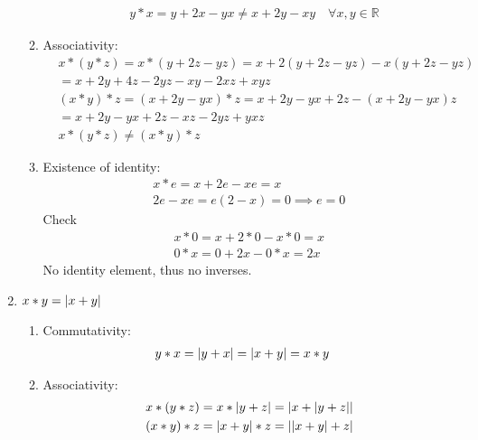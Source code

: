 \documentclass[nohyper,nobib]{tufte-handout}
\theoremstyle{definition}
\theoremstyle{remark}
\begin{document}
\begin{enumerate}
\begin{enumerate}[I]
                \begin{align}
                    & y * x = y + 2x - yx \neq x + 2y -xy \quad\forall x,y \in \mathbb{R}
                \end{align}
            \item Associativity:
                \begin{align}
                    &x * (y * z) = x * (y + 2z - yz) = x + 2(y + 2z - yz) - x(y + 2z - yz) \nonumber \\
                    &= x + 2y + 4z -2yz - xy - 2xz + xyz \nonumber \\
                    &(x * y) * z = (x + 2y - yx) * z = x + 2y - yx + 2z - (x + 2y -yx)z \nonumber \\
                                &= x + 2y - yx + 2z - xz - 2yz + yxz \nonumber \\
                                &x * (y * z) \neq (x * y) * z
                \end{align}
            \item Existence of identity:
                \begin{align}
                    x * e =  x + 2e - xe = x \nonumber \\
                    2e - xe = e(2 - x) = 0 \implies e = 0
                \end{align}
                Check
                \begin{align}
                    x * 0 = x + 2*0 - x*0 =  x \\
                    0 * x = 0 + 2x - 0*x  = 2x
                \end{align}
                No identity element, thus no inverses.
        \end{enumerate}
    \item $x * y = \abs{x + y}$
        \begin{enumerate}[I]
            \item Commutativity:
                \begin{align}
                    &y * x = \abs{y + x} = \abs{x + y} = x * y
                \end{align}
            \item Associativity:
                \begin{align}
                    &x * (y * z) = x * \abs{y + z} = \abs{x + \abs{y + z}} \nonumber \\
                    &(x * y) * z = \abs{x + y} * z = \abs{\abs{x + y} + z} 
                \end{align}

\end{enumerate}
\end{enumerate}
\end{document}
